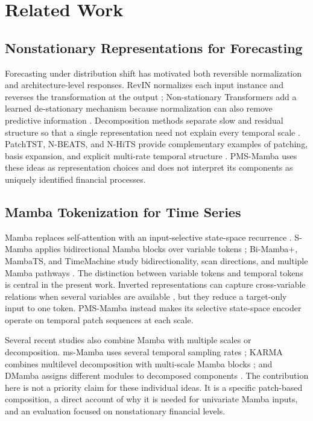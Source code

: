 \section{Related Work}

\subsection{Nonstationary Representations for Forecasting}

Forecasting under distribution shift has motivated both reversible normalization and architecture-level responses.
RevIN normalizes each input instance and reverses the transformation at the output \cite{revin}; Non-stationary Transformers add a learned de-stationary mechanism because normalization can also remove predictive information \cite{nonstationary-transformer}.
Decomposition methods separate slow and residual structure so that a single representation need not explain every temporal scale \cite{autoformer,fedformer,dlinear}.
PatchTST, N-BEATS, and N-HiTS provide complementary examples of patching, basis expansion, and explicit multi-rate temporal structure \cite{patchtst,nbeats,nhits}.
PMS-Mamba uses these ideas as representation choices and does not interpret its components as uniquely identified financial processes.

\subsection{Mamba Tokenization for Time Series}

Mamba replaces self-attention with an input-selective state-space recurrence \cite{mamba}.
S-Mamba applies bidirectional Mamba blocks over variable tokens \cite{smamba}; Bi-Mamba+, MambaTS, and TimeMachine study bidirectionality, scan directions, and multiple Mamba pathways \cite{bimamba,mambats,timemachine}.
The distinction between variable tokens and temporal tokens is central in the present work.
Inverted representations can capture cross-variable relations when several variables are available \cite{itransformer}, but they reduce a target-only input to one token.
PMS-Mamba instead makes its selective state-space encoder operate on temporal patch sequences at each scale.

Several recent studies also combine Mamba with multiple scales or decomposition.
ms-Mamba uses several temporal sampling rates \cite{msmamba}; KARMA combines multilevel decomposition with multi-scale Mamba blocks \cite{karma}; and DMamba assigns different modules to decomposed components \cite{dmamba}.
The contribution here is not a priority claim for these individual ideas.
It is a specific patch-based composition, a direct account of why it is needed for univariate Mamba inputs, and an evaluation focused on nonstationary financial levels.

